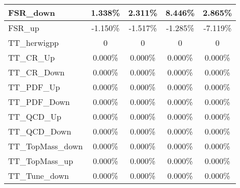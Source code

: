 \begin{table}[]
{\begin{tabular}{|l|c|c|c|c|}
FSR\_down                                & 1.338\%                                   & 2.311\%                                  & 8.446\%                                 & 2.865\%                                  \\ \hline
FSR\_up                                  & -1.150\%                                     & -1.517\%                                    & -1.285\%                                   & -7.119\%                                    \\ \hline 
TT\_herwigpp                      & 0                       & 0                       & 0                      & 0                       \\ \hline         
TT\_CR\_Up                         & 0.000\%                          & 0.000\%                          & 0.000\%                         & 0.000\%                           \\ \hline        
TT\_CR\_Down                       & 0.000\%                        & 0.000\%                        & 0.000\%                       & 0.000\%                           \\ \hline        
TT\_PDF\_Up                        & 0.000\%                         & 0.000\%                         & 0.000\%                        & 0.000\%                       \\ \hline    
TT\_PDF\_Down                      & 0.000\%                       & 0.000\%                       & 0.000\%                      & 0.000\%                       \\ \hline    
TT\_QCD\_Up                        & 0.000\%                         & 0.000\%                         & 0.000\%                        & 0.000\%                       \\ \hline    
TT\_QCD\_Down                      & 0.000\%                       & 0.000\%                       & 0.000\%                      & 0.000\%                       \\ \hline    
TT\_TopMass\_down                      & 0.000\%                       & 0.000\%                       & 0.000\%                      & 0.000\%                       \\ \hline    
TT\_TopMass\_up                      & 0.000\%                       & 0.000\%                       & 0.000\%                      & 0.000\%                       \\ \hline        
TT\_Tune\_down            & 0.000\%             & 0.000\%             & 0.000\%            & 0.000\%             \\ \hline      

\end{tabular}}
\end{table}
